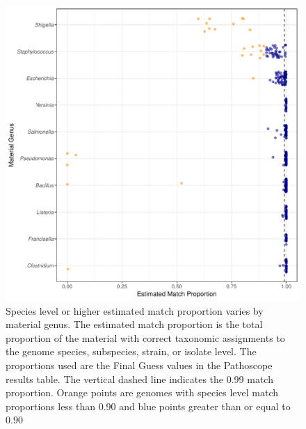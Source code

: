 \documentclass[fleqn,10pt,lineno]{wlpeerj}\usepackage[]{graphicx}\usepackage[]{color}
\makeatletter
\def\maxwidth{ %
  \ifdim\Gin@nat@width>\linewidth
    \linewidth
  \else
    \Gin@nat@width
  \fi
}
\newenvironment{knitrout}{}{} %
\makeatother
\begin{document}
\begin{knitrout}
\color{fgcolor}\begin{figure}
\includegraphics[width=\maxwidth]{figure/species_prop-1} \caption[Species level or higher estimated match proportion varies by material genus]{Species level or higher estimated match proportion varies by material genus. The estimated match proportion is the total proportion of the material with correct taxonomic assignments to the genome species, subspecies, strain, or isolate level. The proportions used are the Final Guess values in the Pathoscope results table. The vertical dashed line indicates the 0.99 match proportion. Orange points are genomes with species level match proportions less than 0.90 and blue points greater than or equal to 0.90}\label{fig:species_prop}
\end{figure}


\end{knitrout}
\end{document}
